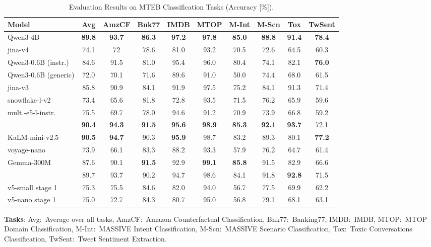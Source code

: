 \documentclass[11pt]{article}
\begin{document}
\begin{table}[H]
\caption{Evaluation Results on MTEB Classification Tasks (Accuracy [\%]).}
\label{tab:mteb_classification_updated}
\centering
\small
\setlength{\tabcolsep}{2pt}
\begin{tabular}{l*{9}{c}}
\toprule
\textbf{Model} & \textbf{Avg} & \textbf{AmzCF} & \textbf{Bnk77} & \textbf{IMDB} & \textbf{MTOP} & \textbf{M-Int} & \textbf{M-Scn} & \textbf{Tox} & \textbf{TwSent} \\
\midrule
Qwen3-4B & \textbf{89.8} & \textbf{93.7} & \textbf{86.3} & \textbf{97.2} & \textbf{97.8} & \textbf{85.0} & \textbf{88.8} & \textbf{91.4} & \textbf{78.4} \\
jina-v4 & 74.1 & 72 & 78.6 & 81.0 & 93.2 & 70.5 & 72.6 & 64.5 & 60.3 \\
\midrule
Qwen3-0.6B (instr.) & 84.6 & 91.5 & 81.0 & 95.4 & 96.0 & 80.4 & 74.1 & 82.1 & \textbf{76.0} \\
Qwen3-0.6B (generic) & 72.0 & 70.1 & 71.6 & 89.6 & 91.0 & 50.0 & 74.4 & 68.0 & 61.5 \\
jina-v3 & 85.8 & 90.9 & 84.1 & 91.9 & 97.5 & 75.2 & 84.1 & 91.3 & 71.4 \\
snowflake-l-v2 & 73.4 & 65.6 & 81.8 & 72.8 & 93.5 & 71.5 & 76.2 & 65.9 & 59.6 \\
mult.-e5-l-instr. & 75.5 & 69.7 & 78.0 & 94.6 & 91.2 & 70.9 & 73.9 & 66.8 & 59.2 \\
\JEmbeddingVFiveTextSmallShort{} & \textbf{90.4} & \textbf{94.3} & \textbf{91.5} & \textbf{95.6} & \textbf{98.9} & \textbf{85.3} & \textbf{92.1} & \textbf{93.7} & 72.1 \\
\midrule
KaLM-mini-v2.5 & \textbf{90.5} & \textbf{94.7} & 90.3 & \textbf{95.9} & 98.7 & 83.2 & 89.3 & 80.1 & \textbf{77.2} \\
voyage-nano & 73.9 & 66.1 & 83.3 & 88.2 & 93.3 & 57.9 & 76.2 & 64.7 & 61.4 \\
Gemma-300M & 87.6 & 90.1 & \textbf{91.5} & 92.9 & \textbf{99.1} & \textbf{85.8} & 91.5 & 82.9 & 66.6 \\
\JEmbeddingVFiveTextNanoShort{} & 89.7 & 93.7 & 90.2 & 94.7 & 98.6 & 84.1 & 91.8 & \textbf{92.8} & 71.5 \\
\midrule
v5-small stage 1 & 75.3 & 75.5 & {84.6} & {82.0} & 94.0 & 56.7 & 77.5 & 69.9 & 62.2 \\
v5-nano stage 1 & 75.0 & 72.7 & 84.3 & 80.7 & {95.0} & {56.8} & 79.1 & 68.1 & 63.1 \\
\bottomrule
\end{tabular}

\vspace{2pt}
\begin{flushleft}
\footnotesize
\textbf{Tasks}: Avg:~Average over all tasks, 
AmzCF:~Amazon Counterfactual Classification, 
Bnk77:~Banking77,
IMDB:~IMDB,
MTOP:~MTOP Domain Classification,
M-Int:~MASSIVE Intent Classification, 
M-Scn:~MASSIVE Scenario Classification, 
Tox:~Toxic Conversations Classification, 
TwSent:~Tweet Sentiment Extraction.
\end{flushleft}
\end{table}
\end{document}

